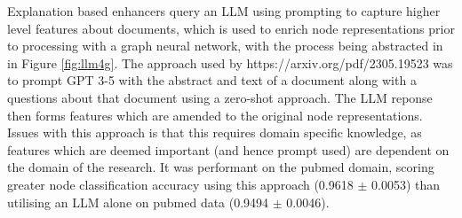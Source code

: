 \documentclass[10pt, english]{article}
\begin{document}
    Explanation based enhancers query an LLM using prompting to capture higher level features about documents, which is used to enrich node representations prior to processing with a graph neural network, with the process being abstracted in in Figure \ref{fig:llm4g}. The approach used by https://arxiv.org/pdf/2305.19523 was to prompt GPT 3-5 with the abstract and text of a document along with a questions about that document using a zero-shot approach. The LLM reponse then forms features which are amended to the original node representations. Issues with this approach is that this requires domain specific knowledge, as features which are deemed important (and hence prompt used) are dependent on the domain of the research. It was performant on the pubmed domain, scoring greater node classification accuracy using this approach (0.9618 $\pm$ 0.0053) than utilising an LLM alone on pubmed data (0.9494 $\pm$ 0.0046).   
\end{document}

